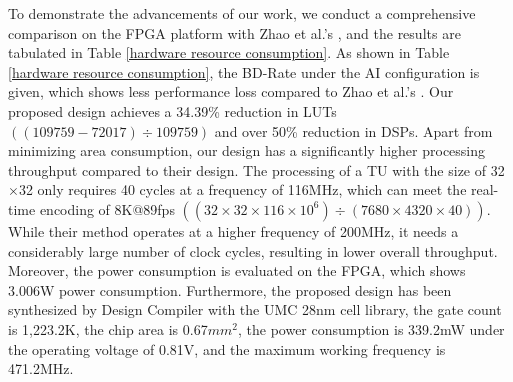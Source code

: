\documentclass[lettersize,journal]{IEEEtran}
\begin{document}
To demonstrate the advancements of our work, we conduct a comprehensive comparison on the FPGA platform with Zhao et al.'s \cite{zhao2023scanline}, and the results are tabulated in Table \ref{hardware resource consumption}. 
As shown in Table \ref{hardware resource consumption}, the BD-Rate under the AI configuration is given, which shows less performance loss compared to Zhao et al.'s \cite{zhao2023scanline}. Our proposed design achieves a 34.39\% reduction in LUTs $((109759 - 72017) \div 109759)$ and over 50\% reduction in DSPs.
Apart from minimizing area consumption, our design has a significantly higher processing throughput compared to their design.
The processing of a TU with the size of 32$\times$32 only requires 40 cycles at a frequency of 116MHz, which can meet the real-time encoding of 8K@89fps $((32\times32\times116\times10^6) \div (7680\times4320\times40))$. 
While their method operates at a higher frequency of 200MHz, it needs a considerably large number of clock cycles, resulting in lower overall throughput. 
Moreover, the power consumption is evaluated on the FPGA, which shows 3.006W power consumption. 
Furthermore, the proposed design has been synthesized by Design Compiler with the UMC 28nm cell library, the gate count is 1,223.2K, the chip area is 0.67$mm^2$, the power consumption is 339.2mW under the operating voltage of 0.81V, and the maximum working frequency is 471.2MHz. 

\end{document}
